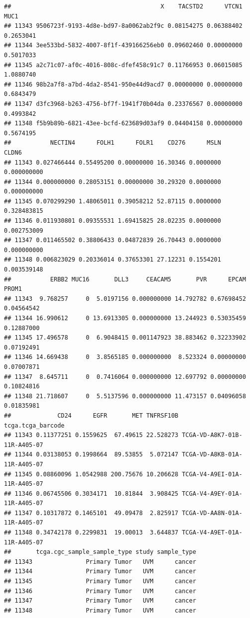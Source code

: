 \documentclass[
]{book}
\begin{document}
\begin{verbatim}
##                                          X    TACSTD2      VTCN1      MUC1
## 11343 9506723f-9193-4d8e-bd97-8a0062ab2f9c 0.08154275 0.06388402 0.2653041
## 11344 3ee533bd-5832-4007-8f1f-439166256eb0 0.09602460 0.00000000 0.5017033
## 11345 a2c71c07-af0c-4016-808c-dfef458c91c7 0.11766953 0.06015085 1.0880740
## 11346 98b2a7f8-a7bd-4da2-8541-950e44d9acd7 0.00000000 0.00000000 0.6843479
## 11347 d3fc3968-b263-4756-bf7f-1941f70b04da 0.23376567 0.00000000 0.4993842
## 11348 f5b9b89b-6821-43ee-bcfd-623689d03af9 0.04404158 0.00000000 0.5674195
##           NECTIN4      FOLH1      FOLR1    CD276      MSLN       CLDN6
## 11343 0.027466444 0.55495200 0.00000000 16.30346 0.0000000 0.000000000
## 11344 0.000000000 0.28053151 0.00000000 30.29320 0.0000000 0.000000000
## 11345 0.070299290 1.48065011 0.39058212 52.87115 0.0000000 0.328483815
## 11346 0.011930801 0.09355531 1.69415825 28.02235 0.0000000 0.002753009
## 11347 0.011465502 0.38806433 0.04872839 26.70443 0.0000000 0.000000000
## 11348 0.006823029 0.20336014 0.37653301 27.12231 0.1554201 0.003539148
##           ERBB2 MUC16       DLL3     CEACAM5       PVR      EPCAM      PROM1
## 11343  9.768257     0  5.0197156 0.000000000 14.792782 0.67698452 0.04564542
## 11344 16.990612     0 13.6913305 0.000000000 13.244923 0.53035459 0.12887000
## 11345 17.496578     0  6.9048415 0.001147923 38.883462 0.32233902 0.07192491
## 11346 14.669438     0  3.8565185 0.000000000  8.523324 0.00000000 0.07007871
## 11347  8.645711     0  0.7416064 0.000000000 12.697792 0.00000000 0.10824816
## 11348 21.718607     0  5.5137596 0.000000000 11.473157 0.04096058 0.01835981
##             CD24      EGFR       MET TNFRSF10B            tcga.tcga_barcode
## 11343 0.11377251 0.1559625  67.49615 22.528273 TCGA-VD-A8K7-01B-11R-A405-07
## 11344 0.03138053 0.1998664  89.53855  5.072147 TCGA-VD-A8KB-01A-11R-A405-07
## 11345 0.08860096 1.0542988 200.75676 10.206628 TCGA-V4-A9EI-01A-11R-A405-07
## 11346 0.06745506 0.3034171  10.81844  3.908425 TCGA-V4-A9EY-01A-11R-A405-07
## 11347 0.10317872 0.1465101  49.09478  2.825917 TCGA-VD-AA8N-01A-11R-A405-07
## 11348 0.34742178 0.2299831  19.00013  3.644837 TCGA-V4-A9ET-01A-11R-A405-07
##       tcga.cgc_sample_sample_type study sample_type
## 11343               Primary Tumor   UVM      cancer
## 11344               Primary Tumor   UVM      cancer
## 11345               Primary Tumor   UVM      cancer
## 11346               Primary Tumor   UVM      cancer
## 11347               Primary Tumor   UVM      cancer
## 11348               Primary Tumor   UVM      cancer
\end{verbatim}
\end{document}
